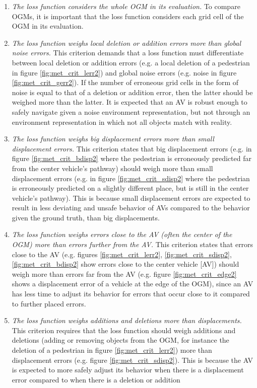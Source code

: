 \begin{enumerate}
	\item \textit{The loss function considers the whole \gls{OGM} in its evaluation.} To compare \glspl{OGM}, it is important that the loss function considers each grid cell of the \gls{OGM} in its evaluation.
	\item \textit{The loss function weighs local deletion or addition errors more than global noise errors.} This criterion demands that a loss function must differentiate between local deletion or addition errors (e.g. a local deletion of a pedestrian in figure \ref{fig:met_crit_lerr2}) and global noise errors (e.g. noise in figure \ref{fig:met_crit_gerr2}). If the number of erroneous grid cells in the form of noise is equal to that of a deletion or addition error, then the latter should be weighed more than the latter. It is expected that an \gls{AV} is robust enough to safely navigate given a noise environment representation, but not through an environment representation in which not all objects match with reality. 
	\item \textit{The loss function weighs big displacement errors more than small displacement errors.} This criterion states that big displacement errors (e.g. in figure \ref{fig:met_crit_bdisp2} where the pedestrian is erroneously predicted far from the center vehicle's pathway) should weigh more than small displacement errors (e.g. in figure \ref{fig:met_crit_sdisp2} where the pedestrian is erroneously predicted on a slightly different place, but is still in the center vehicle's pathway). This is because small displacement errors are expected to result in less deviating and unsafe behavior of \glspl{AV} compared to the behavior given the ground truth, than big displacements.
	\item \textit{The loss function weighs errors close to the \gls{AV} (often the center of the \gls{OGM}) more than errors further from the \gls{AV}.} This criterion states that errors close to the \gls{AV} (e.g. figures \ref{fig:met_crit_lerr2}, \ref{fig:met_crit_sdisp2}, \ref{fig:met_crit_bdisp2} show errors close to the center vehicle [\gls{AV}]) should weigh more than errors far from the \gls{AV} (e.g. figure \ref{fig:met_crit_edge2} shows a displacement error of a vehicle at the edge of the \gls{OGM}), since an \gls{AV} has less time to adjust its behavior for errors that occur close to it compared to further placed errors.
	\item \textit{The loss function weighs additions and deletions more than displacements.} This criterion requires that the loss function should weigh additions and deletions (adding or removing objects from the \gls{OGM}, for instance the deletion of a pedestrian in figure \ref{fig:met_crit_lerr2}) more than displacement errors (e.g. figure \ref{fig:met_crit_sdisp2}). This is because the \gls{AV} is expected to more safely adjust its behavior when there is a displacement error compared to when there is a deletion or addition
\end{enumerate} 

